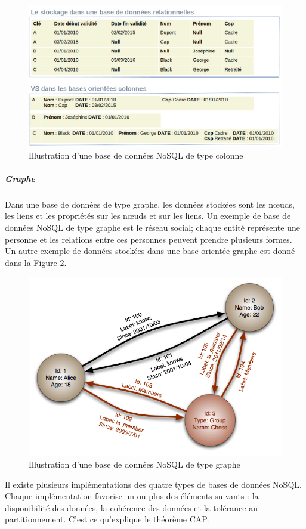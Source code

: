 	\begin{figure}[h]
		\centering
		\includegraphics[width=\linewidth]{illustrations/colomn-db-1.png}
		\caption{Illustration d'une base de données NoSQL de type colonne}
		\label{fig:comomn-nosql}
	\end{figure}
	\subparagraph{Graphe} Dans une base de données de type graphe, les données stockées sont les n\oe{}uds, les liens et les propriétés sur les n\oe{}uds et sur les liens. Un exemple  de base de données NoSQL de type graphe est le réseau social; chaque entité représente une personne et les relations entre ces personnes peuvent prendre plusieurs formes. Un autre exemple de données stockées  dans une base orientée graphe est donné dans la Figure  	\ref{fig:graphe-nosql}.
	\begin{figure}[h]
		\centering
		\includegraphics[width=.7\linewidth]{illustrations/GraphDatabase_PropertyGraph.png}		
		\caption{Illustration d'une base de données NoSQL de type graphe}
		\label{fig:graphe-nosql}
	\end{figure}
	Il existe plusieurs implémentations des quatre types de bases de données NoSQL. Chaque implémentation favorise un ou plus des éléments suivants : la disponibilité des données, la cohérence des données et la tolérance au partitionnement.  C'est ce qu'explique le théorème CAP.	
